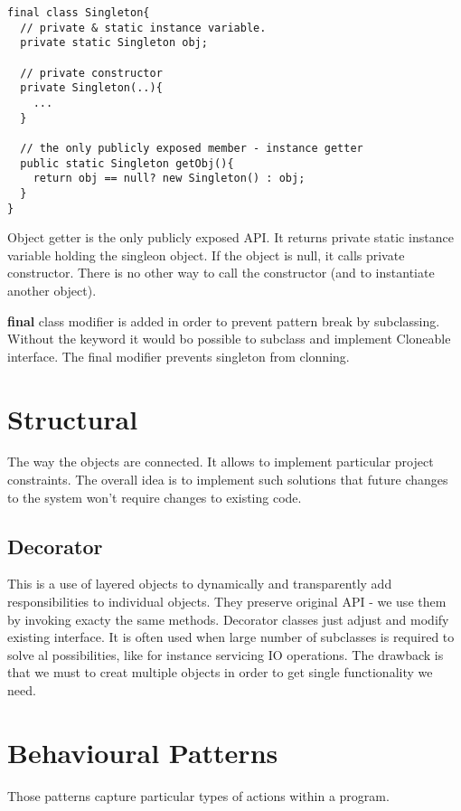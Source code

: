\documentclass{report}
\begin{document}
\begin{verbatim}
final class Singleton{
  // private & static instance variable.
  private static Singleton obj;

  // private constructor
  private Singleton(..){
    ...
  }

  // the only publicly exposed member - instance getter
  public static Singleton getObj(){
    return obj == null? new Singleton() : obj;
  }
}
\end{verbatim}

Object getter is the only publicly exposed API. It returns private static instance variable holding the singleon object. If the object is null, it calls private constructor. There is no other way to call the constructor (and to instantiate another object).

\textbf{final} class modifier is added in order to prevent pattern break by subclassing. Without the keyword it would bo possible to subclass and implement Cloneable interface.
The final modifier prevents singleton from clonning.



\part{Structural}
The way the objects are connected. It allows to implement particular project constraints. The overall idea is to implement such solutions
that future changes to the system won't require changes to existing code.


\chapter{Decorator}
This is a use of layered objects to dynamically and transparently add responsibilities to individual objects. They preserve
original API - we use them by invoking exacty the same methods. Decorator classes just adjust and modify existing interface.
It is often used when large number of subclasses is required to solve al possibilities, like for instance servicing IO
operations. The drawback is that we must to creat multiple objects in order to get single functionality we need.




\part{Behavioural Patterns}
Those patterns capture particular types of actions within a program.
\end{document}
